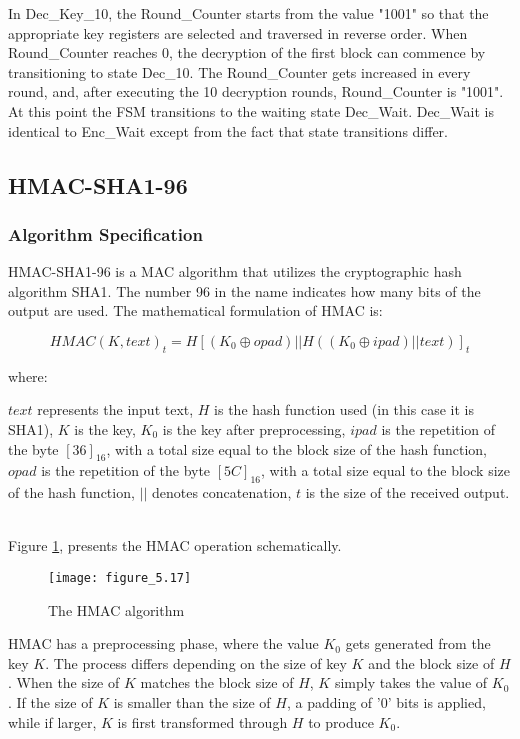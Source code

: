 In Dec\_Key\_10, the Round\_Counter starts from the value "1001" so that the appropriate key registers are selected and traversed in reverse order. When Round\_Counter reaches 0, the decryption of the first block can commence by transitioning to state Dec\_10. The Round\_Counter gets increased in every round, and, after executing the 10 decryption rounds, Round\_Counter is "1001". At this point the FSM transitions to the waiting state Dec\_Wait. Dec\_Wait is identical to Enc\_Wait except from the fact that state transitions differ.

\subsection{HMAC-SHA1-96}
\subsubsection*{Algorithm Specification}
HMAC-SHA1-96 is a MAC algorithm that utilizes the cryptographic hash algorithm SHA1. The number 96 in the name indicates how many bits of the output are used. The mathematical formulation of HMAC is:

\begin{equation}
HMAC(K, text)_t=H[(K_0\oplus opad) || H((K_0\oplus ipad) || text)]_t
\end{equation}

\noindent
where:
\begin{outline}
\1 $text$ represents the input text,
\1 $H$ is the hash function used (in this case it is SHA1),
\1 $K$ is the key,
\1 $K_0$ is the key after preprocessing,
\1 $ipad$ is the repetition of the byte $[36]_{16}$, with a total size equal to the block size of the hash function,
\1 $opad$ is the repetition of the byte $[5C]_{16}$, with a total size equal to the block size of the hash function,
\1 $||$ denotes concatenation,
\1 $t$ is the size of the received output.
\end{outline}\\

\noindent
Figure \ref{fig:figure_5.17}, presents the HMAC operation schematically.

\begin{figure}[H]
\centering
\texttt{[image: figure\_5.17]}\\
\caption{ The HMAC algorithm}
\label{fig:figure_5.17}
\end{figure}

HMAC has a preprocessing phase, where the value $K_0$ gets generated from the key $K$. The process differs depending on the size of key $K$ and the block size of $H$. When the size of $K$ matches the block size of $H$, $K$ simply takes the value of $K_0$. If the size of $K$ is smaller than the size of $H$, a padding of '0' bits is applied, while if larger, $K$ is first transformed through $H$ to produce $K_0$.

